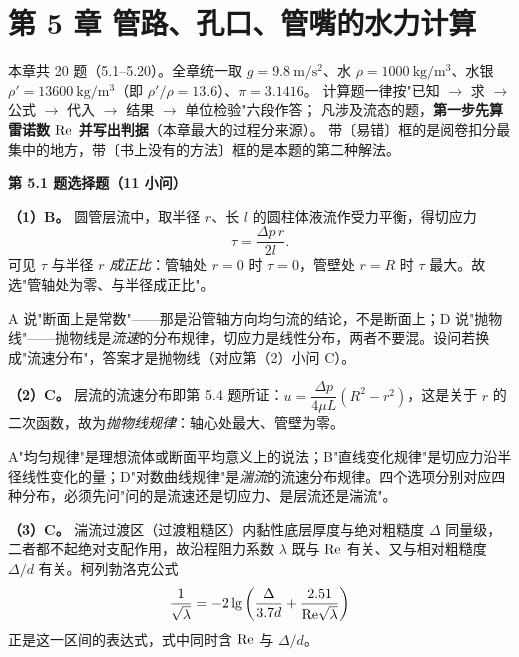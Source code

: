 \chapter*{第 5 章 管路、孔口、管嘴的水力计算}

\begin{tishi}
本章共 20 题（5.1--5.20）。全章统一取 $g=9.8\ \mathrm{m/s^2}$、水 $\rho=1000\ \mathrm{kg/m^3}$、水银 $\rho'=13600\ \mathrm{kg/m^3}$（即 $\rho'/\rho=13.6$）、$\pi=3.1416$。
计算题一律按"已知 $\to$ 求 $\to$ 公式 $\to$ 代入 $\to$ 结果 $\to$ 单位检验"六段作答；
凡涉及流态的题，\textbf{第一步先算雷诺数 $\mathrm{Re}$ 并写出判据}（本章最大的过程分来源）。
带〔易错〕框的是阅卷扣分最集中的地方，带〔书上没有的方法〕框的是本题的第二种解法。
\end{tishi}

\noindent\textbf{第 5.1 题\quad 选择题（11 小问）}

\begin{jie}
\textbf{（1）B。} 圆管层流中，取半径 $r$、长 $l$ 的圆柱体液流作受力平衡，得切应力
\[\tau=\frac{\Delta p\,r}{2l}.\]
可见 $\tau$ 与半径 $r$ \emph{成正比}：管轴处 $r=0$ 时 $\tau=0$，管壁处 $r=R$ 时 $\tau$ 最大。故选"管轴处为零、与半径成正比"。
\end{jie}
\begin{yicuo}
A 说"断面上是常数"——那是沿管轴方向均匀流的结论，不是断面上；D 说"抛物线"——抛物线是\emph{流速}的分布规律，切应力是线性分布，两者不要混。设问若换成"流速分布"，答案才是抛物线（对应第（2）小问 C）。
\end{yicuo}

\begin{jie}
\textbf{（2）C。} 层流的流速分布即第 5.4 题所证：$u=\dfrac{\Delta p}{4\mu L}\left(R^2-r^2\right)$，这是关于 $r$ 的二次函数，故为\emph{抛物线规律}：轴心处最大、管壁为零。
\end{jie}
\begin{yicuo}
A"均匀规律"是理想流体或断面平均意义上的说法；B"直线变化规律"是切应力沿半径线性变化的量；D"对数曲线规律"是\emph{湍流}的流速分布规律。四个选项分别对应四种分布，必须先问"问的是流速还是切应力、是层流还是湍流"。
\end{yicuo}

\begin{jie}
\textbf{（3）C。} 湍流过渡区（过渡粗糙区）内黏性底层厚度与绝对粗糙度 $\Delta$ 同量级，二者都不起绝对支配作用，故沿程阻力系数 $\lambda$ 既与 $\mathrm{Re}$ 有关、又与相对粗糙度 $\Delta/d$ 有关。柯列勃洛克公式
\[\frac{1}{\sqrt{\lambda}}=-2\lg\left(\frac{\Delta}{3.7d}+\frac{2.51}{\mathrm{Re}\sqrt{\lambda}}\right)\]
正是这一区间的表达式，式中同时含 $\mathrm{Re}$ 与 $\Delta/d$。
\end{jie}

